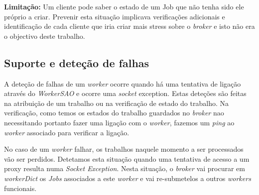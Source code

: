 \documentclass[a4paper]{article}
\begin{document}
\textbf{Limitação:} Um cliente pode saber o estado de um Job  que não tenha sido ele próprio a criar. Prevenir esta situação implicava verificações adicionais e identificação de cada cliente que iria criar mais stress sobre o \emph{broker} e isto não era o objectivo deste trabalho.




\subsection{Suporte e deteção de falhas}

A deteção de falhas de um \emph{worker} ocorre quando há uma tentativa de ligação através do \emph{WorkerSAO} e ocorre uma \emph{socket} exception. Estas deteções são feitas na atribuição de um trabalho ou na verificação de estado do trabalho. Na verificação, como temos os estados do trabalho guardados no \emph{broker} nao necessitando portanto fazer uma ligação com o \emph{worker}, fazemos um \emph{ping} ao \emph{worker} associado para verificar a ligação.

No caso de um \emph{worker} falhar, os trabalhos naquele momento a ser processados vão ser perdidos. Detetamos esta situação quando uma tentativa de acesso a um proxy resulta numa \emph{Socket Exception}. Nesta situação, o \emph{broker} vai procurar em \emph{workerDict} os \emph{Jobs} associados a este \emph{worker} e vai re-submetelos a outros \emph{workers} funcionais.	
	
\end{document}
